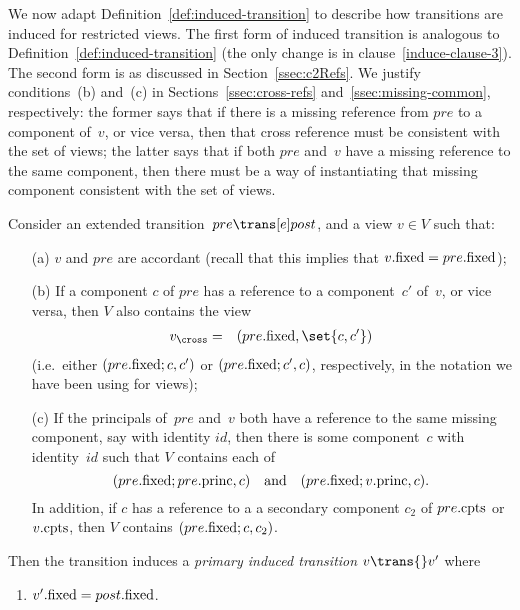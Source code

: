 We now adapt Definition~\ref{def:induced-transition} to describe how
transitions are induced for restricted views.  The first form of induced
transition is analogous to Definition~\ref{def:induced-transition} (the only
change is in clause~\ref{induce-clause-3}).  The second form is as discussed
in Section~\ref{ssec:c2Refs}.  We justify conditions~(b) and~(c) in
Sections~\ref{ssec:cross-refs} and~\ref{ssec:missing-common}, respectively:
the former says that if there is a missing reference from $pre$ to a component
of~$v$, or vice versa, then that cross reference must be consistent with the
set of views; the latter says that if both $pre$ and~$v$ have a missing
reference to the same component, then there must be a way of instantiating
that missing component consistent with the set of views.
%
\begin{definition}
\label{def:induced-transition-singleRef}
Consider an extended transition~$pre \trans[e] post$, and a view $v \in V$
such that:
%
\begin{enumerate}
\item[(a)] $v$ and $pre$ are accordant (recall that this implies that
  $v.\mathrm{fixed} = pre.\mathrm{fixed}$);

\item[(b)] If a component $c$ of $pre$ has a reference to a component~$c'$
  of~$v$, or vice versa, then $V$ also contains the view
\begin{eqnarray*}
v_\cross & = & (pre.\fixed, \set{c, c'})
\end{eqnarray*}
(i.e.~either $(pre.\mathrm{fixed}; c, c')$ or  $(pre.\mathrm{fixed}; c', c)$, respectively, in
the notation we have been using for views);

\item[(c)] If the principals of~$pre$ and~$v$ both have a reference to the
  same missing component, say with identity $id$, then there is some
  component~$c$ with identity~$id$ such that $V$ contains each of
\[
(pre.\mathrm{fixed}; pre.\mathrm{princ}, c) \quad\mbox{and}\quad (pre.\mathrm{fixed}; v.\mathrm{princ}, c) .
\]
In addition, if $c$ has a reference to a a secondary component $c_2$ of
$pre.\mathrm{cpts}$ or $v.\mathrm{cpts}$, then $V$ contains $(pre.\mathrm{fixed}; c, c_2)$.
\end{enumerate}
%
Then
the transition induces a \emph{primary induced transition} $v \trans{} v'$ where
\begin{enumerate}
\item $v'.\mathrm{fixed} = post.\mathrm{fixed}$.


\end{enumerate}
\end{definition}
